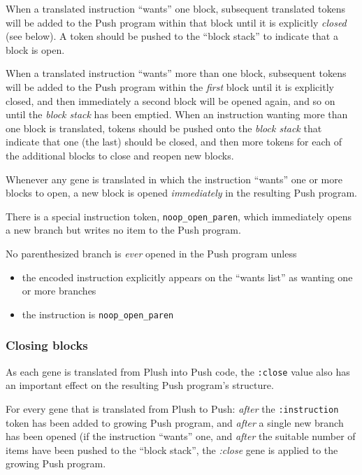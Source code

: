 When a translated instruction ``wants'' one block, subsequent translated tokens will be added to the Push program within that block until it is explicitly \textit{closed} (see below). A token should be pushed to the ``block stack'' to indicate that a block is open.

When a translated instruction ``wants'' more than one block, subsequent tokens will be added to the Push program within the \textit{first} block until it is explicitly closed, and then immediately a second block will be opened again, and so on until the \textit{block stack} has been emptied. When an instruction wanting more than one block is translated, tokens should be pushed onto the \textit{block stack} that indicate that one (the last) should be closed, and then more tokens for each of the additional blocks to close and reopen new blocks.

Whenever any gene is translated in which the instruction ``wants'' one or more blocks to open, a new block is opened \textit{immediately} in the resulting Push program.

There is a special instruction token, \texttt{noop\_open\_paren}, which immediately opens a new branch but writes no item to the Push program.

No parenthesized branch is \textit{ever} opened in the Push program unless

\begin{itemize}

\item the encoded instruction explicitly appears on the ``wants list'' as wanting one or more branches
\item the instruction is \texttt{noop\_open\_paren}

\end{itemize}

\subsubsection{Closing blocks}

As each gene is translated from Plush into Push code, the \texttt{:close} value also has an important effect on the resulting Push program's structure.

For every gene that is translated from Plush to Push: \textit{after} the \texttt{:instruction} token has been added to growing Push program, and \textit{after} a single new branch has been opened (if the instruction ``wants'' one, and \textit{after} the suitable number of items have been pushed to the ``block stack'', the \textit{:close} gene is applied to the growing Push program.

